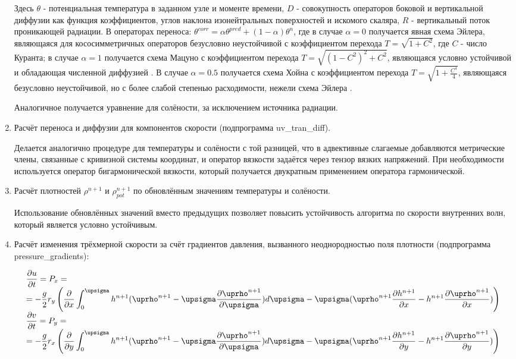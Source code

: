 \begin{enumerate}
Здесь $\theta$ - потенциальная температура в заданном узле и моменте времени, 
$D$ - совокупность операторов боковой и вертикальной диффузии как функция коэффициентов, углов наклона изонейтральных поверхностей и искомого скаляра, 
$R$ - вертикальный поток проникающей радиации. 
В операторах переноса: $\theta^{corr} = \alpha \theta^{pred} + (1 - \alpha) \theta^n$, где в случае $\alpha = 0$ получается явная схема Эйлера, 
являющаяся для кососимметричных операторов безусловно неустойчивой с коэффициентом перехода $T = \sqrt{1 + C^2}$, где $C$ - число Куранта; 
в случае $\alpha = 1$ получается схема Мацуно с коэффициентом перехода $T = \sqrt{(1 - C^2)^2 + C^2}$, являющаяся условно устойчивой и обладающая численной диффузией \cite{ROUCH}. 
В случае $\alpha = 0.5$ получается схема Хойна с коэффициентом перехода $T = \sqrt{1 + \frac{C^4}{4}}$, являющаяся безусловно неустойчивой, но с более слабой степенью расходимости, нежели схема Эйлера \cite{ROUCH}.

Аналогичное получается уравнение для солёности, за исключением источника радиации. 

\item Расчёт переноса и диффузии для компонентов скорости (подпрограмма uv\_tran\_diff). 

Делается аналогично процедуре для температуры и солёности с той разницей, 
что в адвективные слагаемые добавляются метрические члены, связанные с кривизной системы координат, и оператор вязкости задаётся через тензор вязких напряжений. 
При необходимости используется оператор бигармонической вязкости, который получается двукратным применением оператора гармонической.

\item Расчёт плотностей $\rho^{n+1}$ и $\rho_{pot}^{n+1}$ по обновлённым значениям температуры и солёности. 

Использование обновлённых значений вместо предыдущих позволяет повысить устойчивость алгоритма по скорости внутренних волн, который является условно устойчивым.

\item Расчёт изменения трёхмерной скорости за счёт градиентов давления, вызванного неоднородностью поля плотности (подпрограмма pressure\_gradients): 

\begin{equation} \label{eq:inmsom/18} 
\begin{array}{l} 
\displaystyle{ \d{u}{t} = P_x = } \\
\displaystyle{= -\frac{g}{2}r_y \left( \d{}{x} \int_0^\sigma h^{n+1} (\rho^{n+1} - \sigma \d{\rho^{n+1}}{\sigma}) d\sigma - \sigma (\rho^{n+1}\d{h^{n+1}}{x} - h^{n+1}\d{\rho^{n+1}}{x}) \right) } \\
\displaystyle{ \d{v}{t} = P_y = } \\
\displaystyle{= -\frac{g}{2}r_x \left( \d{}{y} \int_0^\sigma h^{n+1} (\rho^{n+1} - \sigma \d{\rho^{n+1}}{\sigma}) d\sigma - \sigma (\rho^{n+1}\d{h^{n+1}}{y} - h^{n+1}\d{\rho^{n+1}}{y}) \right) }
\end{array} 
\end{equation} 


\end{enumerate}

